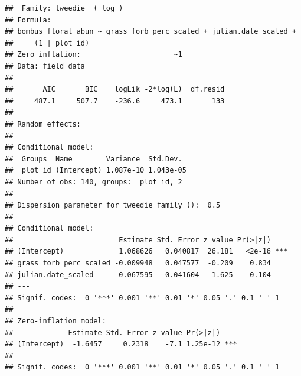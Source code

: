 \documentclass[
]{article}
\begin{document}
\begin{verbatim}
##  Family: tweedie  ( log )
## Formula:          
## bombus_floral_abun ~ grass_forb_perc_scaled + julian.date_scaled +  
##     (1 | plot_id)
## Zero inflation:                      ~1
## Data: field_data
## 
##       AIC       BIC    logLik -2*log(L)  df.resid 
##     487.1     507.7    -236.6     473.1       133 
## 
## Random effects:
## 
## Conditional model:
##  Groups  Name        Variance  Std.Dev. 
##  plot_id (Intercept) 1.087e-10 1.043e-05
## Number of obs: 140, groups:  plot_id, 2
## 
## Dispersion parameter for tweedie family ():  0.5 
## 
## Conditional model:
##                         Estimate Std. Error z value Pr(>|z|)    
## (Intercept)             1.068626   0.040817  26.181   <2e-16 ***
## grass_forb_perc_scaled -0.009948   0.047577  -0.209    0.834    
## julian.date_scaled     -0.067595   0.041604  -1.625    0.104    
## ---
## Signif. codes:  0 '***' 0.001 '**' 0.01 '*' 0.05 '.' 0.1 ' ' 1
## 
## Zero-inflation model:
##             Estimate Std. Error z value Pr(>|z|)    
## (Intercept)  -1.6457     0.2318    -7.1 1.25e-12 ***
## ---
## Signif. codes:  0 '***' 0.001 '**' 0.01 '*' 0.05 '.' 0.1 ' ' 1
\end{verbatim}
\end{document}
